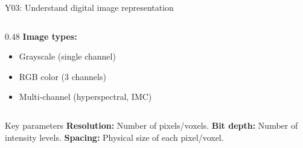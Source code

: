 \documentclass[aspectratio=169, 10pt]{beamer}
\begin{document}
\begin{frame}{Y03: Understand digital image representation}
\begin{columns}[T]
\begin{column}{0.48\textwidth}
            \vspace{0.2cm}
            \textbf{Image types:}
            \begin{itemize}
                \item Grayscale (single channel)
                \item RGB color (3 channels)
                \item Multi-channel (hyperspectral, IMC)
            \end{itemize}
        \end{column}
    \end{columns}
    
    \vspace{0.2cm}
    \begin{block}{Key parameters}
        \textbf{Resolution:} Number of pixels/voxels. \textbf{Bit depth:} Number of intensity levels. \textbf{Spacing:} Physical size of each pixel/voxel.
    \end{block}
\end{frame}
\end{document}
